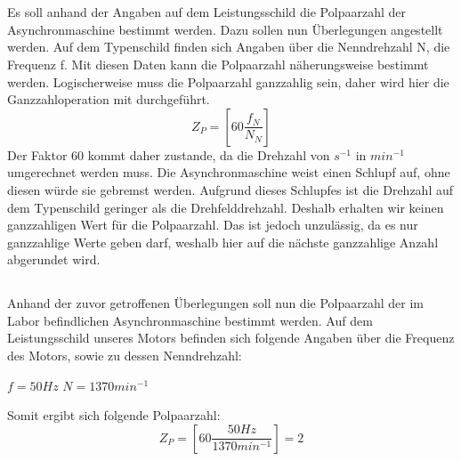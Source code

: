 \chapter{}
\section{}
Es soll anhand der Angaben auf dem Leistungsschild die Polpaarzahl der Asynchronmaschine bestimmt werden. Dazu sollen nun Überlegungen angestellt werden. Auf dem Typenschild finden sich Angaben über die Nenndrehzahl N, die Frequenz f. Mit diesen Daten kann die Polpaarzahl näherungsweise bestimmt werden. Logischerweise muss die Polpaarzahl ganzzahlig sein, daher wird hier die Ganzzahloperation mit durchgeführt.
\begin{equation}
	Z_{P} = \left[60\frac{f_{N}}{N_{N}}\right]
\end{equation}
Der Faktor 60 kommt daher zustande, da die Drehzahl von $ s^{-1} $ in $ min^{-1} $ umgerechnet werden muss. Die Asynchronmaschine weist einen Schlupf auf, ohne diesen würde sie gebremst werden. Aufgrund dieses Schlupfes ist die Drehzahl auf dem Typenschild geringer als die Drehfelddrehzahl. Deshalb erhalten wir keinen ganzzahligen Wert für die  Polpaarzahl. Das ist jedoch unzulässig, da es nur ganzzahlige Werte geben darf, weshalb hier auf die nächste ganzzahlige Anzahl abgerundet wird.

\section{}
Anhand der zuvor getroffenen Überlegungen soll nun die Polpaarzahl der im Labor befindlichen Asynchronmaschine bestimmt werden. Auf dem Leistungsschild unseres Motors befinden sich folgende Angaben über die Frequenz des Motors, sowie zu dessen Nenndrehzahl:
\begin{center}
	$ f = 50Hz $ \hspace{2cm} $ N = 1370min^{-1} $
\end{center}
Somit ergibt sich folgende Polpaarzahl:
\begin{equation}
	Z_{P} = \left[60\frac{50Hz}{1370min^{-1}}\right] = 2
\end{equation}

